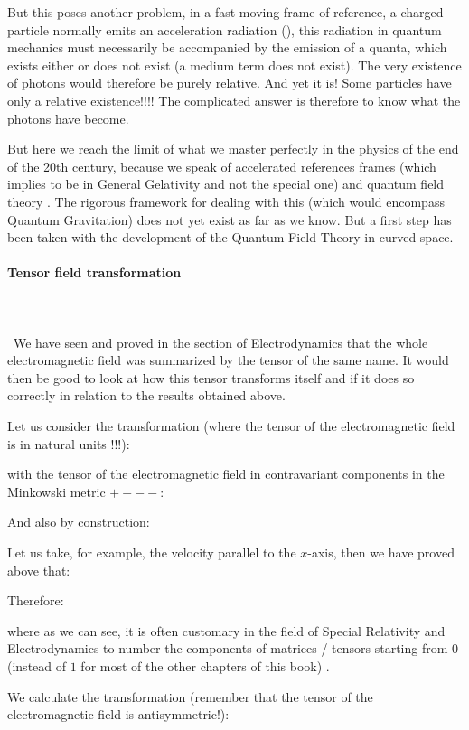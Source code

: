 	But this poses another problem, in a fast-moving frame of reference, a charged particle normally emits an acceleration radiation (), this radiation in quantum mechanics must necessarily be accompanied by the emission of a quanta, which exists either or does not exist (a medium term does not exist). The very existence of photons would therefore be purely relative. And yet it is! Some particles have only a relative existence!!!! The complicated answer is therefore to know what the photons have become.

	But here we reach the limit of what we master perfectly in the physics of the end of the 20th century, because we speak of accelerated references frames (which implies to be in General Gelativity and not the special one) and quantum field theory . The rigorous framework for dealing with this (which would encompass Quantum Gravitation) does not yet exist as far as we know. But a first step has been taken with the development of the Quantum Field Theory in curved space.
	
	\pagebreak
	\paragraph{Tensor field transformation}\mbox{}\\\\\
	We have seen and proved in the section of Electrodynamics that the whole electromagnetic field was summarized by the tensor of the same name. It would then be good to look at how this tensor transforms itself and if it does so correctly in relation to the results obtained above.

	Let us consider the transformation (where the tensor of the electromagnetic field is in natural units !!!):
	
	with the tensor of the electromagnetic field in contravariant components in the Minkowski metric $+---$:
	
	And also by construction:
	
	Let us take, for example, the velocity parallel to the $x$-axis, then we have proved above that:
	
	Therefore:
	
	where as we can see, it is often customary in the field of Special Relativity and Electrodynamics to number the components of matrices / tensors starting from $0$ (instead of $1$ for most of the other chapters of this book) .

	We calculate the transformation (remember that the tensor of the electromagnetic field is antisymmetric!):
	
